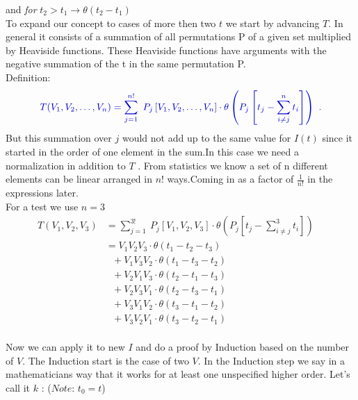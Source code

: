 \documentclass[12pt, titlepage]{article}
\begin{document}
\begin{subappendices}
and
\textit{for} $ t_2 > t_1  \rightarrow \theta (t_2 -t_1)$\\
To expand our concept to cases of more then  two $  t $ we start by advancing $ T $.
In general it consists of a summation of all permutations P of a given set multiplied by Heaviside functions. These Heaviside functions have arguments with the negative summation of the t in the same permutation P.\\
Definition:
\begin{equation}\textcolor[RGB]{0,0,204}{
T(V_1, V_2,\ldots,V_n)=
\sum_{j=1}^{n!}\ P_{j}
\left[
V_1, V_2,\ldots,V_n
 \right]  
\cdot
\theta \left(P_{j}\left[t_{j} -\sum_{i\neq j}^{n} t_{i}\right]\right)\ .
}
\end{equation}
But this summation over $ j $ would not add up to the same value for $ I(t) $ since it started in the order of one element in the sum.In this case we need a normalization in addition to $ T $ . From statistics we know a set of n different elements can be linear arranged in $ n! $ ways.Coming in as a factor of $ \frac{1}{n!} $ in the expressions later.
\\
For a test we use $ n=3 $
\begin{subequations}
\begin{align}
T(V_1, V_2,V_3)
&=
\sum_{j=1}^{3!}\ P_{j}
\left[
V_1, V_2,V_3
 \right]  
\cdot
\theta \left(P_{j}\left[t_{j} -\sum_{i\neq j}^{3} t_{i}\right]\right)\
&\\
&=V_{1}V_{2}V_{3}\cdot \theta(t_{1}-t_{2}-t_{3})
	&\\
	& \ \ \ +V_{1}V_{3}V_{2} \cdot \theta(t_{1}-t_{3}-t_{2})
	&\\
	& \ \ \ +V_{2}V_{1}V_{3} \cdot \theta(t_{2}-t_{1}-t_{3})
	&\\
	& \ \ \ +V_{2}V_{3}V_{1} \cdot \theta(t_{2}-t_{3}-t_{1})
	&\\
	& \ \ \ +V_{3}V_{1}V_{2} \cdot \theta(t_{3}-t_{1}-t_{2})
	&\\
	& \ \ \ +V_{3}V_{2}V_{1} \cdot \theta(t_{3}-t_{2}-t_{1})
\end{align}
\end{subequations}
\\
Now we can apply it to new $ I $ and do a proof by Induction based on the number of $ V $. The Induction start is the case of two $ V $. In the Induction step we say in a mathematicians way that it works for at least one unspecified higher order. Let's call it $ k $ : ($ \textit{Note:} $ $ t_0 = t $)\\
\begin{equation}

\end{equation}
\end{subappendices}
\end{document}

